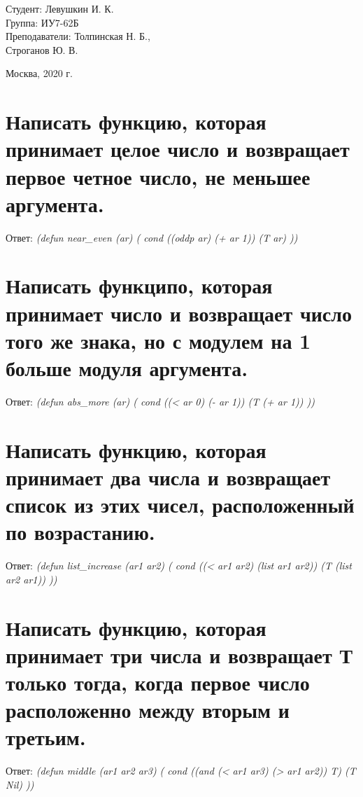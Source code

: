 \documentclass[a4paper,12pt]{article}
\begin{document}
	\vspace*{15mm} 	
	
	\large
	\begin{flushright}
		Студент: Левушкин И. К. \\
		Группа: ИУ7-62Б \\
		Преподаватели: Толпинская Н. Б., \\ Строганов Ю. В. \\
	\end{flushright}
	
	\vspace*{30mm}
	\begin{center}
		Москва, 2020 г.  
	\end{center}
	\thispagestyle{empty}
	
	
	\newpage
	
	\section{Написать функцию, которая принимает целое число и возвращает первое
четное число, не меньшее аргумента.
	}

	Ответ: \textit{(defun near\_even (ar) (
		cond ((oddp ar) (+ ar 1))
		(T ar)
		))}

	\section{Написать функципо, которая принимает число и возвращает число
того же знака, но с модулем на 1 больше модуля аргумента.
	}

	Ответ: \textit{(defun abs\_more (ar) (
		cond ((< ar 0) (- ar 1))
		(T (+ ar 1))
		))}

	\section{Написать функцию, которая принимает два числа и возвращает
список из этих чисел, расположенный по возрастанию.
	}
	
	Ответ: \textit{(defun list\_increase (ar1 ar2) (
		cond ((< ar1 ar2) (list ar1 ar2))
		(T (list ar2 ar1))
		))}

	\section{Написать функцию, которая принимает три числа и возвращает Т только
тогда, когда первое число расположенно между вторым и третьим.
	}
	
	Ответ: \textit{(defun middle (ar1 ar2 ar3) (
		cond ((and (< ar1 ar3) (> ar1 ar2)) T)
		(T Nil)
		))}
\end{document}
